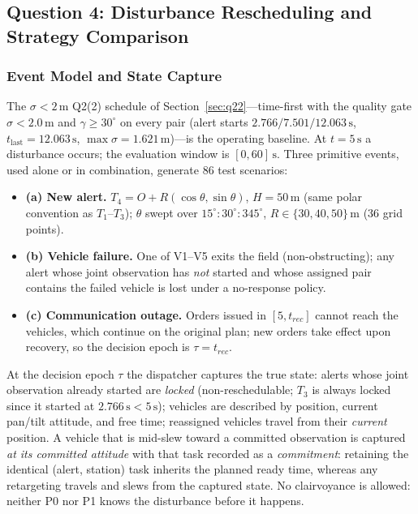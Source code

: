 \subsection{Question 4: Disturbance Rescheduling and Strategy Comparison}\label{sec:q4}

\subsubsection{Event Model and State Capture}

The $\sigma<2\,\mathrm{m}$ Q2(2) schedule of Section~\ref{sec:q22}---time-first with the
quality gate $\sigma<2.0\,\mathrm{m}$ and $\gamma\ge30^\circ$ on every pair (alert
starts $2.766/7.501/12.063\,\mathrm{s}$, $t_{\mathrm{last}}=12.063\,\mathrm{s}$,
$\max\sigma=1.621\,\mathrm{m}$)---is the operating baseline. At $t=5\,\mathrm{s}$ a
disturbance occurs;
the evaluation window is $[0,60]\,\mathrm{s}$. Three primitive events, used alone or in
combination, generate 86 test scenarios:
\begin{itemize}
\item \textbf{(a) New alert.} $T_4=O+R(\cos\theta,\sin\theta)$, $H=50\,\mathrm{m}$
(same polar convention as $T_1$--$T_3$); $\theta$ swept over
$15^\circ{:}30^\circ{:}345^\circ$, $R\in\{30,40,50\}\,\mathrm{m}$ (36 grid points).
\item \textbf{(b) Vehicle failure.} One of V1--V5 exits the field (non-obstructing);
any alert whose joint observation has \emph{not} started and whose assigned pair
contains the failed vehicle is lost under a no-response policy.
\item \textbf{(c) Communication outage.} Orders issued in $[5,t_{rec}]$ cannot reach
the vehicles, which continue on the original plan; new orders take effect upon
recovery, so the decision epoch is $\tau=t_{rec}$.
\end{itemize}
At the decision epoch $\tau$ the dispatcher captures the true state: alerts whose joint
observation already started are \emph{locked} (non-reschedulable; $T_3$ is always
locked since it started at $2.766\,\mathrm{s}<5\,\mathrm{s}$); vehicles are described
by position, current pan/tilt attitude, and free time; reassigned vehicles travel from
their \emph{current} position. A vehicle that is mid-slew toward a committed
observation is captured \emph{at its committed attitude} with that task recorded as a
\emph{commitment}: retaining the identical (alert, station) task inherits the planned
ready time, whereas any retargeting travels and slews from the captured state. No
clairvoyance is allowed: neither P0 nor P1 knows the disturbance before it happens.

